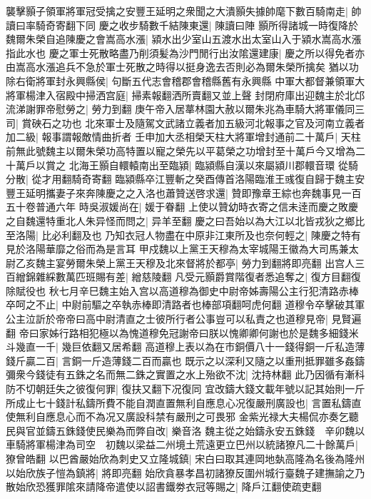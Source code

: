襲擊顥子領軍將軍冠受擒之安豐王延明之衆聞之大潰顥失據帥麾下數百騎南走|{
	帥讀曰率騎奇寄翻下同}
慶之收步騎數千結陳東還|{
	陳讀曰陣}
顥所得諸城一時復降於魏爾朱榮自追陳慶之會嵩高水漲|{
	潁水出少室山五渡水出太室山入于潁水嵩高水漲指此水也}
慶之軍士死散略盡乃削須髪為沙門閒行出汝隂還建康|{
	慶之所以得免者亦由嵩高水漲追兵不急於軍士死散之時得以挺身逸去否則必為爾朱榮所擒矣}
猶以功除右衛將軍封永興縣侯|{
	句斷五代志會稽郡會稽縣舊有永興縣}
中軍大都督兼領軍大將軍楊津入宿殿中掃洒宫庭|{
	掃素報翻洒所賣翻又並上聲}
封閉府庫出迎魏主於北邙流涕謝罪帝慰勞之|{
	勞力到翻}
庚午帝入居蕐林園大赦以爾朱兆為車騎大將軍儀同三司|{
	賞硤石之功也}
北來軍士及隨駕文武諸立義者加五級河北報事之官及河南立義者加二級|{
	報事謂報敵情曲折者}
壬申加大丞相榮天柱大將軍增封通前二十萬戶|{
	天柱前無此號魏主以爾朱榮功高特置以寵之榮先以平葛榮之功增封至十萬戶今又增為二十萬戶以賞之}
北海王顥自轘轅南出至臨潁|{
	臨潁縣自漢以來屬潁川郡轘音環}
從騎分散|{
	從才用翻騎奇寄翻}
臨潁縣卒江豐斬之癸酉傳首洛陽臨淮王彧復自歸于魏主安豐王延明攜妻子來奔陳慶之之入洛也蕭贊送啓求還|{
	贊即豫章王綜也奔魏事見一百五十卷普通六年}
時吳淑媛尚在|{
	媛于眷翻}
上使以贊幼時衣寄之信未逹而慶之敗慶之自魏還特重北人朱异怪而問之|{
	异羊至翻}
慶之曰吾始以為大江以北皆戎狄之鄉比至洛陽|{
	比必利翻及也}
乃知衣冠人物盡在中原非江東所及也奈何輕之|{
	陳慶之特有見於洛陽華靡之俗而為是言耳}
甲戍魏以上黨王天穆為太宰城陽王徽為大司馬兼太尉乙亥魏主宴勞爾朱榮上黨王天穆及北來督將於都亭|{
	勞力到翻將即亮翻}
出宫人三百繒錦雜綵數萬匹班賜有差|{
	繒慈陵翻}
凡受元顥爵賞階復者悉追奪之|{
	復方目翻復除賦役也}
秋七月辛巳魏主始入宫以高道穆為御史中尉帝姊壽陽公主行犯清路赤棒卒呵之不止|{
	中尉前驅之卒執赤棒即清路者也棒部項翻呵虎何翻}
道穆令卒擊破其軍公主泣訢於帝帝曰高中尉清直之士彼所行者公事豈可以私責之也道穆見帝|{
	見賢遍翻}
帝曰家姊行路相犯極以為愧道穆免冠謝帝曰朕以愧卿卿何謝也於是魏多細錢米斗幾直一千|{
	幾巨依翻又居希翻}
高道穆上表以為在市銅價八十一錢得銅一斤私造薄錢斤贏二百|{
	言銅一斤造薄錢二百而贏也}
既示之以深利又隨之以重刑抵罪雖多姦鑄彌衆今錢徒有五銖之名而無二銖之實置之水上殆欲不沈|{
	沈持林翻}
此乃因循有漸科防不切朝廷失之彼復何罪|{
	復扶又翻下况復同}
宜改鑄大錢文載年號以記其始則一斤所成止七十錢計私鑄所費不能自潤直置無利自應息心况復嚴刑廣設也|{
	言置私鑄直使無利自應息心而不為况又廣設科禁有嚴刑之可畏邪}
金紫光禄大夫楊侃亦奏乞聽民與官並鑄五銖錢使民樂為而弊自改|{
	樂音洛}
魏主從之始鑄永安五銖錢　辛卯魏以車騎將軍楊津為司空　初魏以梁益二州境土荒遠更立巴州以統諸獠凡二十餘萬戶|{
	獠曾皓翻}
以巴酋嚴始欣為刺史又立隆城鎮|{
	宋白曰取其連岡地埶高隆為名後為隆州}
以始欣族子愷為鎮將|{
	將即亮翻}
始欣貪暴孝昌初諸獠反圍州城行臺魏子建撫諭之乃散始欣恐獲罪隂來請降帝遣使以詔書鐵劵衣冠等賜之|{
	降戶江翻使疏吏翻}
